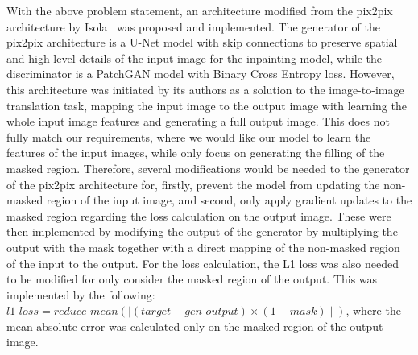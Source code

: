 \documentclass[10pt,twocolumn,letterpaper]{article}
\begin{document}
With the above problem statement, an architecture modified from the pix2pix architecture by Isola~\etal\cite{Isola2018} was proposed and implemented. The generator of the pix2pix architecture is
a U-Net model with skip connections to preserve spatial and high-level details of the input image for the inpainting model, while the discriminator is a PatchGAN
model with Binary Cross Entropy loss. However, this architecture was initiated by its authors as a solution to the image-to-image translation task, mapping the input image to the output image 
with learning the whole input image features and generating a full output image. This does not fully match our requirements, where we would like our model to learn the features of the input images, 
while only focus on generating the filling of the masked region. Therefore, several modifications would be needed to the generator of the pix2pix architecture for, firstly, prevent the model from updating
the non-masked region of the input image, and second, only apply gradient updates to the masked region regarding the loss calculation on the output image. These were then implemented by modifying 
the output of the generator by multiplying the output with the mask together with a direct mapping of the non-masked region of the input to the output. For the loss calculation, the L1 loss was 
also needed to be modified for only consider the masked region of the output. This was implemented by the following: $l1\_loss = reduce\_mean(\mid(target - gen\_output) \times (1 - mask)\mid)$, 
where the mean absolute error was calculated only on the masked region of the output image.
\end{document}
